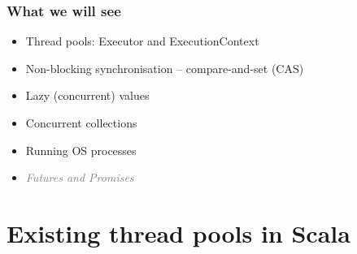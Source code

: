 \documentclass[aspectratio=169]{beamer}
\begin{document}
\begin{frame}[t]\frametitle{What we will see}

  \begin{itemize}
    \item Thread pools: Executor and ExecutionContext
    \item Non-blocking synchronisation -- compare-and-set (CAS)
    \item Lazy (concurrent) values
    \item Concurrent collections
    \item Running OS processes
    \item \textcolor{gray}{\emph{Futures and Promises}}

  \end{itemize}


\end{frame}



\section{Existing thread pools in Scala} %
\end{document}
